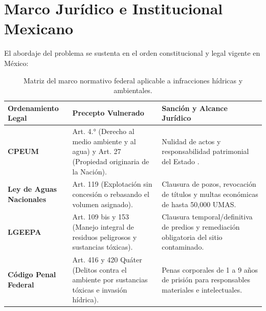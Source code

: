 \section{Marco Jurídico e Institucional Mexicano}
El abordaje del problema se sustenta en el orden constitucional y legal vigente en México:
\begin{table}[h!]
    \centering
    \small
    \begin{tabularx}{\textwidth}{lYY}
        \toprule
        \textbf{Ordenamiento Legal} & \textbf{Precepto Vulnerado} & \textbf{Sanción y Alcance Jurídico} \\
        \midrule
        \textbf{CPEUM} & Art. 4.° (Derecho al medio ambiente y al agua) y Art. 27 (Propiedad originaria de la Nación). & Nulidad de actos y responsabilidad patrimonial del Estado \parencite{cpeum2024}. \\
        \textbf{Ley de Aguas Nacionales} & Art. 119 (Explotación sin concesión o rebasando el volumen asignado). & Clausura de pozos, revocación de títulos y multas económicas de hasta 50,000 UMAS. \\
        \textbf{LGEEPA} & Art. 109 bis y 153 (Manejo integral de residuos peligrosos y sustancias tóxicas). & Clausura temporal/definitiva de predios y remediación obligatoria del sitio contaminado. \\
        \textbf{Código Penal Federal} & Art. 416 y 420 Quáter (Delitos contra el ambiente por sustancias tóxicas e invasión hídrica). & Penas corporales de 1 a 9 años de prisión para responsables materiales e intelectuales. \\
        \bottomrule
    \end{tabularx}
    \caption{Matriz del marco normativo federal aplicable a infracciones hídricas y ambientales.}
\end{table}

